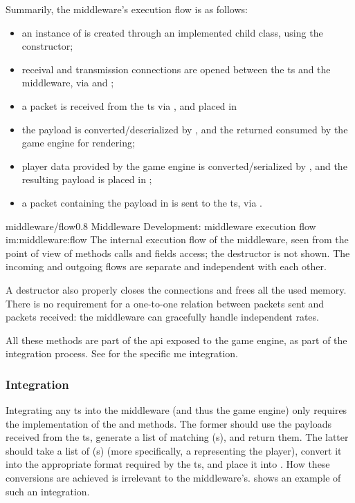 Summarily, the \gls{middleware}'s execution flow is as follows:

\begin{itemize}
	\item an instance of  is created through an implemented child class, using the  constructor;
	\item receival and transmission connections are opened between the \gls{ts} and the \gls{middleware}, via  and ;
	\item a \gls{packet} is received from the \gls{ts} via , and placed in 
	\item the \gls{payload} is converted/deserialized by , and the returned  consumed by the game engine for rendering;
	\item player data provided by the game engine is converted/serialized by , and the resulting \gls{payload} is placed in ;
	\item a \gls{packet} containing the \gls{payload} in  is sent to the \gls{ts}, via .
\end{itemize}

\begin{image}
	{middleware/flow}{0.8}
	{Middleware Development: \gls{middleware} execution flow}
	{im:middleware:flow}
	{}
	{The internal execution flow of the \gls{middleware}, seen from the point of view of methods calls and fields access; the destructor is not shown. The incoming and outgoing flows are separate and independent with each other.}
\end{image}

A destructor also properly closes the connections and frees all the used memory. There is no requirement for a one-to-one relation between \glspl{packet} sent and \glspl{packet} received: the \gls{middleware} can gracefully handle independent rates.

All these methods are part of the \gls{api} exposed to the game engine, as part of the integration process. See  for the specific \gls{me} integration.

\subsubsection{Integration}

Integrating any \gls{ts} into the \gls{middleware} (and thus the game engine) only requires the implementation of the  and  methods. The former should use the \glspl{payload} received from the \gls{ts}, generate a list of matching (s), and return them. The latter should take a list of (s) (more specifically, a  representing the player), convert it into the appropriate format required by the \gls{ts}, and place it into . How these conversions are achieved is irrelevant to the \gls{middleware}'s.  shows an example of such an integration.

